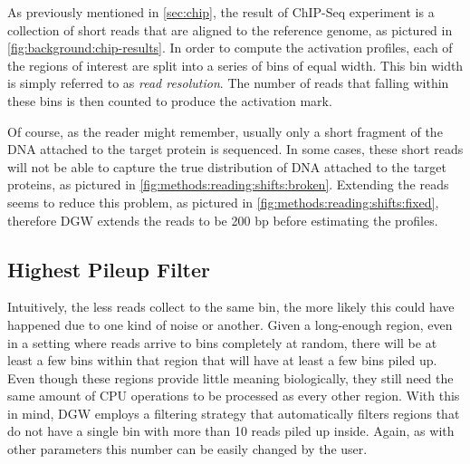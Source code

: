 \documentclass[parskip]{cs4rep}
\begin{document}
As previously mentioned in \autoref{sec:chip}, the result of ChIP-Seq experiment is a collection of short reads that are aligned to the reference genome, as pictured in \autoref{fig:background:chip-results}. In order to compute the activation profiles, each of the regions of interest are split into a series of bins of equal width. This bin width is simply referred to as \emph{read resolution}. The number of reads that falling within these bins is then counted to produce the activation mark.

Of course, as the reader might remember, usually only a short fragment of the DNA attached to the target protein is sequenced. In some cases, these short reads will not be able to capture the true distribution of DNA attached to the target proteins, as pictured in \autoref{fig:methods:reading:shifts:broken}. Extending the reads seems to reduce this problem, as pictured in \autoref{fig:methods:reading:shifts:fixed}, therefore DGW extends the reads to be 200 bp before estimating the profiles.

\subsection{Highest Pileup Filter}
Intuitively, the less reads collect to the same bin, the more likely this could have happened due to one kind of noise or another. Given a long-enough region, even in a setting where reads arrive to bins completely at random, there will be at least a few bins within that region that will have at least a few bins piled up. Even though these regions provide little meaning biologically, they still need the same amount of CPU operations to be processed as every other region. With this in mind, DGW employs a filtering strategy that automatically filters regions that do not have a single bin with more than 10 reads piled up inside. Again, as with other parameters this number can be easily changed by the user.
\end{document}
